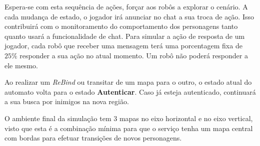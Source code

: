 Espera-se com esta sequência de ações, forçar aos robôs a explorar o cenário.
%
A cada mudança de estado, o jogador irá anunciar no chat a sua troca de ação.
%
Isso contribuirá com o monitoramento do comportamento dos personagens tanto quanto usará a funcionalidade de chat.
%
Para simular a ação de resposta de um jogador, cada robô que receber uma mensagem terá uma porcentagem fixa de $25\%$ responder a sua ação no atual momento.
%
Um robô não poderá responder a ele mesmo.


Ao realizar um \textit{ReBind} ou transitar de um mapa para o outro, o estado atual do automato volta para o estado \textbf{Autenticar}.
%
Caso já esteja autenticado, continuará a sua busca por inimigos na nova região.

O ambiente final da simulação tem 3 mapas no eixo horizontal e no eixo vertical, visto que esta é a combinação mínima para que o serviço tenha um mapa central com bordas para efetuar transições de novos personagens.

%
